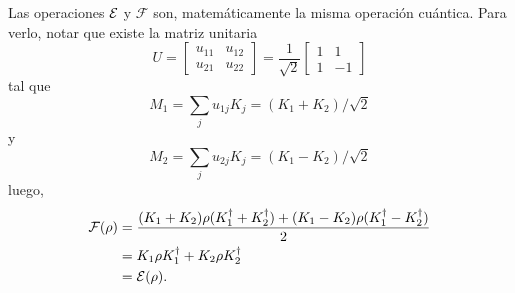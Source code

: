 Las operaciones $\mathcal{E}$ y $\mathcal{F}$ son, matemáticamente la misma operación cuántica. Para verlo, notar que existe la matriz unitaria \[U=\begin{bmatrix}u_{11}&u_{12} \\u_{21}&u_{22}\end{bmatrix}=\dfrac{1}{\sqrt{2}}\begin{bmatrix}1&1 \\1&-1\end{bmatrix}\]tal que \[M_1=\sum_{j} u_{1j}K_j=(K_1+K_2)/\sqrt{2}\] y \[M_2=\sum_j u_{2j}K_j=(K_1-K_2)/\sqrt{2}\] luego,
\begin{equation} 
    \begin{split}
        \mathcal{F}(\rho)&=\dfrac{(K_1+K_2)\rho(K_1^\dagger+K_2^\dagger)+(K_1-K_2)\rho(K_1^\dagger-K_2^\dagger)}{2}\\
        &=K_1\rho K_1^\dagger+K_2\rho K_2^\dagger\\
        &=\mathcal{E}(\rho).
    \end{split}
\end{equation}
